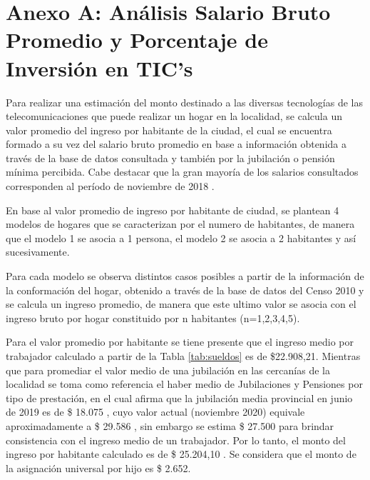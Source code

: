 \section{Anexo A: Análisis Salario Bruto Promedio y Porcentaje de Inversión en TIC's}

%

%
%



Para realizar una estimación del monto destinado a las diversas tecnologías de las telecomunicaciones que puede realizar un hogar en la localidad, se calcula un valor promedio del ingreso por habitante de la ciudad, el cual se encuentra formado a su vez del salario  bruto promedio en base a información obtenida a través de la base de datos consultada \cite{base-datos} y también por la jubilación o pensión mínima percibida. Cabe destacar que la gran mayoría de los salarios consultados corresponden al período de noviembre de 2018 \cite{drive}.

En base al valor promedio de ingreso por habitante de ciudad, se plantean 4 modelos de hogares que se caracterizan por el numero de habitantes, de manera que el modelo 1 se asocia a 1 persona, el modelo 2 se asocia a 2 habitantes y así sucesivamente.

Para cada modelo se observa distintos casos posibles a partir de la información de la conformación del hogar, obtenido a través de la base de datos del Censo 2010 y se calcula un ingreso promedio, de manera que este ultimo valor se asocia con el ingreso bruto por hogar constituido por n habitantes (n=1,2,3,4,5).

Para el valor promedio por habitante se tiene presente 
que el ingreso medio por trabajador calculado a partir de la Tabla \ref{tab:sueldos} es de \$22.908,21.
Mientras que para promediar el valor medio de una jubilación en las cercanías de la localidad se toma como referencia el haber medio de Jubilaciones y Pensiones por tipo de prestación, en el cual afirma que la jubilación media provincial en junio de 2019 es de \$ 18.075 \cite{jub-media}, cuyo valor actual (noviembre 2020) equivale aproximadamente a \$ 29.586 \cite{inflacion}, sin embargo se estima \$ 27.500 para brindar consistencia con el ingreso medio de un trabajador. Por lo tanto, el monto del ingreso por habitante calculado es de \$ 25.204,10 . Se considera que el monto de la asignación universal por hijo es \$ 2.652.



